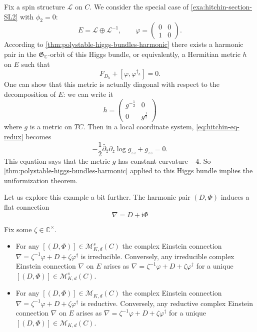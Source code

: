 \documentclass[12pt,letterpaper,reqno]{article}
\numberwithin{equation}{section}
\newcommand{\fG}{{\mathfrak G}}
\newcommand{\cL}{\ensuremath{\mathcal L}}
\newcommand{\cM}{\ensuremath{\mathcal M}}
\newcommand{\C}{\ensuremath{\mathbb C}}
\newcommand{\half}{\ensuremath{\frac{1}{2}}}
\newcommand{\I}{{\mathrm i}}
\newcommand{\fixme}[1]{{\color{orange}{[#1]}}}
\begin{document}
\begin{example} Fix a spin
structure $\cL$ on $C$. We consider the special case of
\autoref{exa:hitchin-section-SL2} with $\phi_2 = 0$:
\begin{equation}
  E = \cL \oplus \cL^{-1}, \qquad \varphi = \begin{pmatrix} 0 & 0 \\ 1 &0 \end{pmatrix}.
\end{equation}
According to \autoref{thm:polystable-higgs-bundles-harmonic}
there exists a harmonic pair in the $\fG_\C$-orbit of this
Higgs bundle, or equivalently, a Hermitian metric $h$ on $E$ such that
\begin{equation} \label{eq:hitchin-eq-redux}
  F_{D_h} + [\varphi, \varphi^{\dagger_h}] = 0.
\end{equation}
One can show \fixme{...} that
this metric is actually diagonal with respect to the decomposition of $E$:
we can write it
\begin{equation}
  h = \begin{pmatrix} g^{-\half} & 0 \\ 0 & g^\half \end{pmatrix}
\end{equation}
where $g$ is a metric on $TC$. Then in a local coordinate system,
\eqref{eq:hitchin-eq-redux} becomes
\begin{equation}
  -\half \bar\partial_{\bar z} \partial_z \log g_{z \bar{z}} + g_{z \bar{z}} = 0.
\end{equation}
This equation says that the metric $g$ has constant curvature
$-4$. So \autoref{thm:polystable-higgs-bundles-harmonic} applied to this
Higgs bundle implies the uniformization theorem.

Let us explore this example a bit further. The harmonic pair
$(D,\Phi)$ induces a flat connection
\begin{equation}
  \nabla = D + \I \Phi
\end{equation}
\fixme{...}

\end{example}


\begin{thm} \label{thm:reductive-connection-harmonic}
Fix some $\zeta \in \C^\times$.
\begin{itemize}
\item For any $[(D,\Phi)] \in \cM^s_{K,d}(C)$ the complex Einstein
connection $\nabla = \zeta^{-1} \varphi + D + \zeta \varphi^\dagger$
is irreducible.
Conversely, any irreducible complex Einstein connection
$\nabla$ on $E$ arises
as $\nabla = \zeta^{-1} \varphi + D + \zeta \varphi^\dagger$
for a unique $[(D,\Phi)] \in \cM^s_{K,d}(C)$.
\item For any $[(D,\Phi)] \in \cM_{K,d}(C)$ the complex Einstein
connection $\nabla = \zeta^{-1} \varphi + D + \zeta \varphi^\dagger$
is reductive.
Conversely, any reductive complex Einstein connection
$\nabla$ on $E$ arises
as $\nabla = \zeta^{-1} \varphi + D + \zeta \varphi^\dagger$
for a unique $[(D,\Phi)] \in \cM_{K,d}(C)$.
\end{itemize}
\end{thm}
\end{document}
